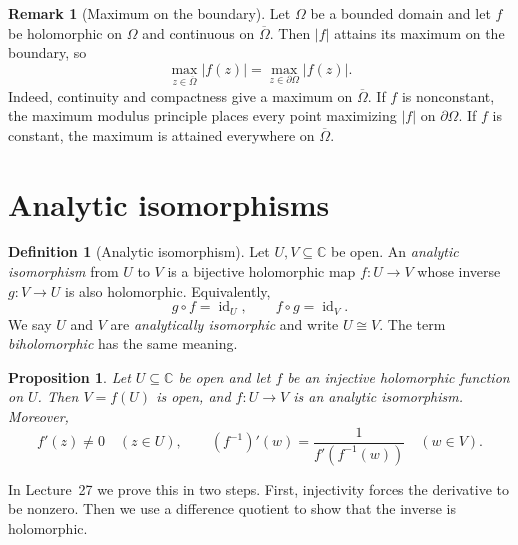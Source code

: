 \documentclass[11pt]{article}
\theoremstyle{plain}
\newtheorem{proposition}[theorem]{Proposition}
\theoremstyle{definition}
\newtheorem{definition}[theorem]{Definition}
\theoremstyle{boldremark}
\newtheorem*{remark}{Remark}
\theoremstyle{remark}
\numberwithin{equation}{section}
\newcommand{\C}{\mathbb{C}}
\begin{document}
\begin{remark}[Maximum on the boundary]
Let $\Omega$ be a bounded domain and let $f$ be holomorphic on $\Omega$
and continuous on $\overline{\Omega}$. Then $|f|$ attains its maximum
on the boundary, so
\[
 \max_{z\in\overline{\Omega}} |f(z)|
 = \max_{z\in\partial\Omega} |f(z)|.
\]
Indeed, continuity and compactness give a maximum on $\overline{\Omega}$.
If $f$ is nonconstant, the maximum modulus principle places every point maximizing $|f|$
 on $\partial\Omega$. If $f$ is constant, the maximum is attained
everywhere on $\overline{\Omega}$.
\end{remark}

\section{Analytic isomorphisms}

\begin{definition}[Analytic isomorphism]
Let $U,V\subseteq\C$ be open. An \emph{analytic isomorphism} from $U$ to $V$
is a bijective holomorphic map $f:U\to V$ whose inverse $g:V\to U$ is also
holomorphic. Equivalently,
\[
 g\circ f=\operatorname{id}_U,\qquad
 f\circ g=\operatorname{id}_V.
\]
We say $U$ and $V$ are \emph{analytically isomorphic} and write $U\cong V$.
The term \emph{biholomorphic} has the same meaning.
\end{definition}

\begin{proposition}\label{prop:analytic-inverse}
Let $U\subseteq\C$ be open and let $f$ be an injective holomorphic function
on $U$. Then $V=f(U)$ is open, and $f:U\to V$ is an analytic isomorphism.
Moreover,
\[
 f'(z)\ne0\quad(z\in U),\qquad
 (f^{-1})'(w)=\frac{1}{f'(f^{-1}(w))}\quad(w\in V).
\]
\end{proposition}
In Lecture~27 we prove this in two steps. First, injectivity forces the derivative to
be nonzero. Then we use a difference quotient to show that the inverse
is holomorphic.
\end{document}
